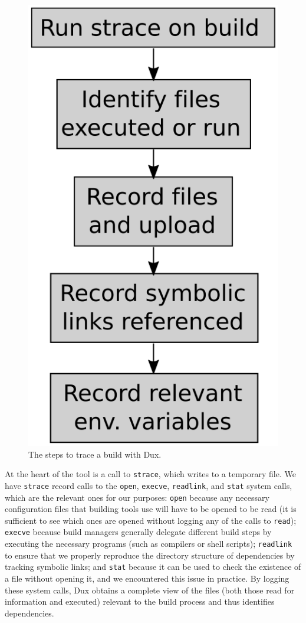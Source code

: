 \documentclass[10pt,conference]{IEEEtran}
\begin{document}
\begin{figure}
\begin{center}
\includegraphics[scale=0.3]{duxtrace}
\end{center}
\caption{The steps to trace a build with Dux.}
\end{figure}

At the heart of the tool is a call to \texttt{strace}, which writes to a temporary file. We have \texttt{strace}
record calls to the \texttt{open}, \texttt{execve}, \texttt{readlink}, and \texttt{stat} system calls,
which are the relevant
ones for our purposes: \texttt{open} because any necessary configuration files that building tools use will
have to be opened to be read (it is sufficient to see which ones are opened without logging any of the
calls to \texttt{read}); \texttt{execve} because build managers generally delegate different build steps by
executing the necessary programs (such as compilers or shell scripts); \texttt{readlink} to ensure that we
properly reproduce the directory structure of dependencies by tracking symbolic links; and \texttt{stat} because
it can be used to check the existence of a file without opening it, and we encountered this issue in practice.
By logging these system
calls, Dux obtains a complete view of the files (both those read for information and executed) relevant to the
build process and thus identifies dependencies.
\end{document}
